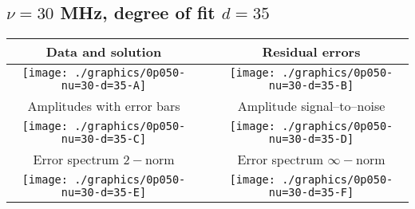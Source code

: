

% 

\clearpage{}
\break{}

\subsection{$\nu = 30$ MHz, degree of fit $d = 35$}

\begin{table}[h]
    \begin{center}
        \begin{tabular}{ccc}
            Data and solution & \quad & Residual errors \\\hline
            \texttt{[image: ./graphics/0p050-nu=30-d=35-A]} &&
            \texttt{[image: ./graphics/0p050-nu=30-d=35-B]} \\[15pt]
            Amplitudes with error bars && Amplitude signal--to--noise \\\hline
            \texttt{[image: ./graphics/0p050-nu=30-d=35-C]} &&
            \texttt{[image: ./graphics/0p050-nu=30-d=35-D]} \\[15pt]
            Error spectrum $2-$norm && Error spectrum $\infty-$norm \\\hline
            \texttt{[image: ./graphics/0p050-nu=30-d=35-E]} &&
            \texttt{[image: ./graphics/0p050-nu=30-d=35-F]} \\[15pt]
        \end{tabular}
    \end{center}
\label{fig:elev=50, nu=30}
\end{table}



\endinput
